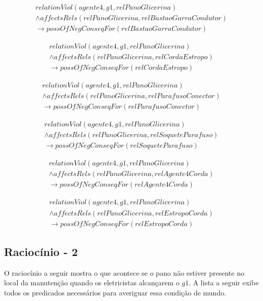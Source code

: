 \begin{eqnarray}\nonumber
	relationViol(agente4,g1,relPanoGlicerina) \nonumber \\
	\wedge affectsRels(relPanoGlicerina,relBastaoGarraCondutor) \nonumber \\
    \to possOfNegConseqFor(relBastaoGarraCondutor)  	
\end{eqnarray}

\begin{eqnarray}\nonumber
	relationViol(agente4,g1,relPanoGlicerina) \nonumber \\
	\wedge affectsRels(relPanoGlicerina,relCordaEstropo) \nonumber \\
    \to possOfNegConseqFor(relCordaEstropo)
\end{eqnarray}

\begin{eqnarray}\nonumber
	relationViol(agente4,g1,relPanoGlicerina) \nonumber \\
	\wedge affectsRels(relPanoGlicerina,relParafusoConector) \nonumber \\
    \to possOfNegConseqFor(relParafusoConector)	 
\end{eqnarray}

\begin{eqnarray}\nonumber
	relationViol(agente4,g1,relPanoGlicerina) \nonumber \\
	\wedge affectsRels(relPanoGlicerina,relSoqueteParafuso) \nonumber \\
    \to possOfNegConseqFor(relSoqueteParafuso)	 	
\end{eqnarray}

\begin{eqnarray}\nonumber
	relationViol(agente4,g1,relPanoGlicerina) \nonumber \\
	\wedge affectsRels(relPanoGlicerina,relAgente4Corda) \nonumber \\
    \to possOfNegConseqFor(relAgente4Corda)	 		
\end{eqnarray}

\begin{eqnarray}\nonumber
	relationViol(agente4,g1,relPanoGlicerina) \nonumber \\
	\wedge affectsRels(relPanoGlicerina,relEstropoCorda) \nonumber \\
    \to possOfNegConseqFor(relEstropoCorda)	 			 
\end{eqnarray}



\subsection{Raciocínio - 2} 
\label{raciocinio2}
O raciocínio a seguir mostra o que acontece se o pano não estiver presente no local da manutenção quando os eletricistas alcançarem o $g1$. A lista a seguir exibe todos os predicados necessários para averiguar essa condição de mundo. 


